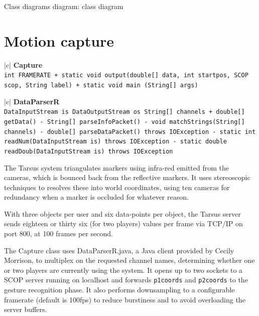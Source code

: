 \documentclass[12pt,a4,notitlepage]{report}
\renewcommand{\_}{\texttt{\symbol{95}}}
\newcommand{\<}{\texttt{\symbol{60}}}
\renewcommand{\>}{\texttt{\symbol{62}}}
\newcommand{\class}[1]{\textbf{#1}}
\newcommand{\scopendpoint}[1]{\texttt{#1}}
\newcommand{\variable}[1]{\texttt{#1}}
\begin{document}
Class diagrams
{diagram: class diagram}

\section{Motion capture}

\begin{tabular}{|c|} \hline 
\class{Capture} \\ \hline
{}
{ \variable{int FRAME\_RATE \newline
+ static void output(double[] data, int startpos, SCOP scop, String label) \newline
+ static void main (String[] args)
} } \\ \hline
\end{tabular}

\begin{tabular}{|c|} \hline 
\class{DataParserR} \\ \hline
{}
{ \variable{DataInputStream is \newline
DataOutputStream os \newline
String[] channels \newline
+ double[] getData() \newline
- String[] parseInfoPacket() \newline
- void matchStrings(String[] channels) \newline
- double[] parseDataPacket() throws IOException \newline
- static int readNum(DataInputStream is) throws IOException \newline
- static double readDoub(DataInputStream is) throws IOException
} } \\ \hline
\end{tabular}

The Tarsus system triangulates markers using infra-red emitted from the cameras, which is bounced back from the reflective markers. It uses stereoscopic techniques to resolves these into world coordinates, using ten cameras for redundancy when a marker is occluded for whatever reason.

With three objects per user and six data-points per object, the Tarsus server sends eighteen or thirty six (for two players) values per frame via TCP/IP on port 800, at 100 frames per second.

The Capture class uses DataParserR.java, a Java client provided by Cecily Morrison, to multiplex on the requested channel names, determining whether one or two players are currently using the system. It opens up to two sockets to a SCOP server running on localhost and forwards \scopendpoint{p1coords} and \scopendpoint{p2coords} to the gesture recognition phase. It also performs downsampling to a configurable framerate (default is 100fps) to reduce burstiness and to avoid overloading the server buffers.
\end{document}
